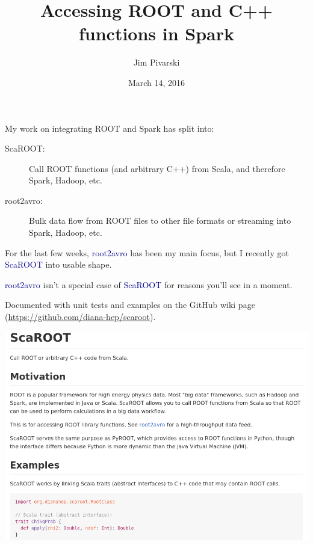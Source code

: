 \documentclass{beamer}
\title[2016-03-14-scaroot]{Accessing ROOT and C++ functions in Spark}
\author{Jim Pivarski}
\institute{Princeton University --- DIANA}
\date{March 14, 2016}
\begin{document}
\begin{frame}
  \titlepage
\end{frame}


\begin{frame}{}
My work on integrating ROOT and Spark has split into:
\begin{description}
\item[ScaROOT:] Call ROOT functions (and arbitrary C++) from Scala, and therefore Spark, Hadoop, etc.
\item[root2avro:] Bulk data flow from ROOT files to other file formats or streaming into Spark, Hadoop, etc.
\end{description}

\vfill
For the last few weeks, \textcolor{darkblue}{root2avro} has been my main focus, but I recently got \textcolor{darkblue}{ScaROOT} into usable shape.

\vfill
\textcolor{darkblue}{root2avro} isn't a special case of \textcolor{darkblue}{ScaROOT} for reasons you'll see in a moment.
\end{frame}

\begin{frame}{}
Documented with unit tests and examples on the GitHub wiki page (\url{https://github.com/diana-hep/scaroot}).

\vspace{0.5 cm}
\includegraphics[width=\linewidth]{wiki.png}
\end{frame}
\end{document}

